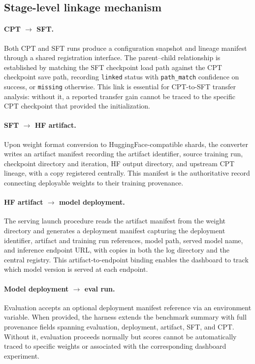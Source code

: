 \subsection{Stage-level linkage mechanism}

\paragraph{CPT $\rightarrow$ SFT.}
Both CPT and SFT runs produce a configuration snapshot and lineage manifest
through a shared registration interface. The parent--child relationship is
established by matching the SFT checkpoint load path against the CPT checkpoint
save path, recording \texttt{linked} status with \texttt{path\_match} confidence
on success, or \texttt{missing} otherwise. This link is essential for
CPT-to-SFT transfer analysis: without it, a reported transfer gain cannot be
traced to the specific CPT checkpoint that provided the initialization.

\paragraph{SFT $\rightarrow$ HF artifact.}
Upon weight format conversion to HuggingFace-compatible shards, the converter
writes an artifact manifest recording the artifact identifier, source training
run, checkpoint directory and iteration, HF output directory, and upstream CPT
lineage, with a copy registered centrally. This manifest is the authoritative
record connecting deployable weights to their training provenance.

\paragraph{HF artifact $\rightarrow$ model deployment.}
The serving launch procedure reads the artifact manifest from the weight
directory and generates a deployment manifest capturing the deployment
identifier, artifact and training run references, model path, served model name,
and inference endpoint URL, with copies in both the log directory and the
central registry. This artifact-to-endpoint binding enables the dashboard to
track which model version is served at each endpoint.

\paragraph{Model deployment $\rightarrow$ eval run.}
Evaluation accepts an optional deployment manifest reference via an environment
variable. When provided, the harness extends the benchmark summary with full
provenance fields spanning evaluation, deployment, artifact, SFT, and CPT.
Without it, evaluation proceeds normally but scores cannot be automatically
traced to specific weights or associated with the corresponding dashboard
experiment.

